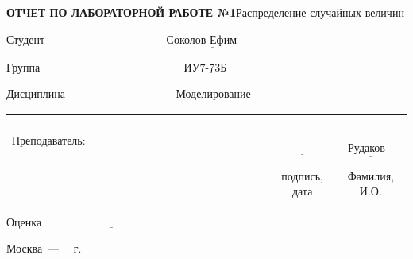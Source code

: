 \begin{titlepage}
	
	\begin{center}
		\noindent\begin{minipage}{1.2\textwidth}\centering
			\textbf{ОТЧЕТ ПО ЛАБОРАТОРНОЙ РАБОТЕ №1}\newline Распределение случайных величин\newline\newline
		\end{minipage}
	\end{center}

	\noindent Студент $\underline{\text{~~~~~~~~~~~~~~~~~~~~~~~~~~~~~~~~Соколов Ефим~~~~~~~~~~~~~~~~~~~~~~~~~~~~~~~~~~~~~~}}$
	
	\noindent Группа $\underline{\text{~~~~~~~~~~~~~~~~~~~~~~~~~~~~~~~~~~~~~~ИУ7-73Б~~~~~~~~~~~~~~~~~~~~~~~~~~~~~~~~~~~~~~~~~}}$
	
	\noindent Дисциплина $\underline{\text{~~~~~~~~~~~~~~~~~~~~~~~~~~~~~Моделирование~~~~~~~~~~~~~~~~~~~~~~~~~~~~~~~~~~~}}$\newline
	
	
	\noindent\begin{tabular}{lcc}
		&&\\
		&&\\
		&&\\
		&&\\
		Преподаватель: ~~~~~~~~~~~~~~~~~~~~~~~~~~~~~~~~~~~~~~~& $\underline{\text{~~~~~~~~~~~~}}$ & $\underline{\text{~~Рудаков И.В.~~}}$ \\
		& \footnotesize подпись, дата & \footnotesize Фамилия, И.О. \\
	\end{tabular}
	\newline\newline\newline
	\noindent Оценка $\underline{\text{~~~~~~~~~~~~~~~~~~~~~~~~~~~~~~~~~~~~}}$
	
	
	\begin{center}
		\vfill
		Москва~---~\the\year
		~г.
	\end{center}
 \restoregeometry
\end{titlepage}
